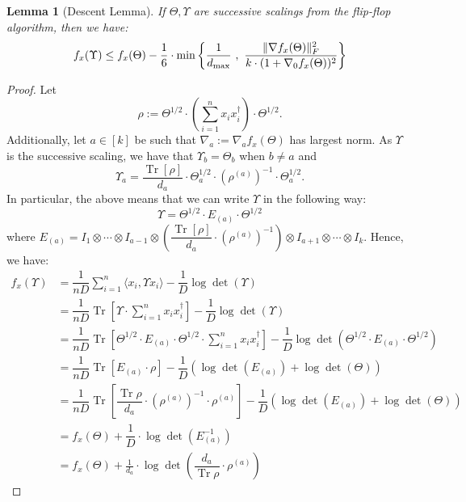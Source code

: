 \documentclass[aos]{imsart}
\newtheorem{lemma}[theorem]{Lemma}
\theoremstyle{definition}
\numberwithin{equation}{section}
\DeclareMathOperator{\tr}{Tr}
\DeclarePairedDelimiter{\norm}{\lVert}{\rVert}
\def\dmax{d_{\max}}
\begin{document}
\begin{lemma}[Descent Lemma]\label{lem:tensor-descent-lemma}
	If $\Theta, \Upsilon$ are successive scalings from the flip-flop algorithm, then we have:
	$$ f_x(\Upsilon) \leq f_x(\Theta) - \dfrac{1}{6} \cdot \min\left\{ \dfrac{1}{\dmax} \ , \ \dfrac{\norm{\nabla f_x(\Theta)}_F^2}{k \cdot (1 + \nabla_0 f_x(\Theta))^2} \right\} $$
\end{lemma}

\begin{proof}
	Let
	$$\rho := \Theta^{1/2} \cdot \left( \sum_{i=1}^n x_i x_i^\dagger \right) \cdot \Theta^{1/2}.$$
	Additionally, let $a \in [k]$ be such that $\nabla_a := \nabla_a f_x(\Theta)$ has largest norm. As $\Upsilon$ is the successive scaling, we have that $\Upsilon_b = \Theta_b$ when $b \neq a$ and
	$$ \Upsilon_a = \dfrac{\tr[\rho]}{d_a} \cdot \Theta_a^{1/2} \cdot (\rho^{(a)})^{-1} \cdot \Theta_a^{1/2}. $$
	In particular, the above means that we can write $\Upsilon$ in the following way:
	$$ \Upsilon = \Theta^{1/2} \cdot  E_{(a)} \cdot \Theta^{1/2} $$
	where $E_{(a)} = I_1 \otimes \cdots \otimes I_{a-1} \otimes \left( \dfrac{\tr[\rho]}{d_a} \cdot (\rho^{(a)})^{-1} \right) \otimes I_{a+1} \otimes \cdots \otimes I_k$.
	Hence, we have:
	\begin{align*}
		f_x(\Upsilon) &= \dfrac{1}{nD} \sum_{i=1}^n \langle x_i , \Upsilon x_i \rangle - \dfrac{1}{D} \log \det(\Upsilon) \\
		&= \dfrac{1}{nD} \tr\left[ \Upsilon \cdot  \sum_{i=1}^n x_i x_i^\dagger  \right] - \dfrac{1}{D} \log \det(\Upsilon) \\
		&= \dfrac{1}{nD} \tr\left[ \Theta^{1/2} \cdot  E_{(a)} \cdot \Theta^{1/2}  \cdot  \sum_{i=1}^n x_i x_i^\dagger  \right] - \dfrac{1}{D} \log \det(\Theta^{1/2} \cdot  E_{(a)} \cdot \Theta^{1/2}) \\
		&= \dfrac{1}{nD} \tr\left[  E_{(a)} \cdot \rho  \right] - \dfrac{1}{D} \left( \log \det(E_{(a)}) + \log\det(\Theta) \right) \\
		&= \dfrac{1}{nD} \tr\left[ \dfrac{\tr \rho}{d_a} \cdot (\rho^{(a)})^{-1} \cdot \rho^{(a)}  \right] - \dfrac{1}{D} \left( \log \det(E_{(a)}) + \log\det(\Theta) \right) \\
		&= f_x(\Theta) + \dfrac{1}{D} \cdot \log \det\left( E_{(a)}^{-1} \right) \\
		&= f_x(\Theta) + \frac{1}{d_a} \cdot  \log\det\left( \dfrac{d_a}{\tr \rho } \cdot \rho^{(a)} \right)
	\end{align*}

\end{proof}
\end{document}
